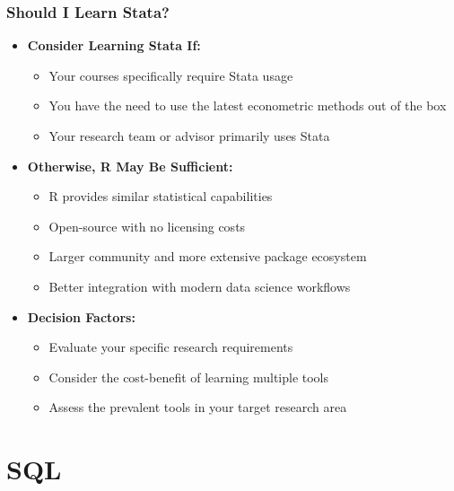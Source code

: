 \documentclass[10pt]{beamer}
\begin{document}
\begin{frame}
    \frametitle{Should I Learn Stata?}
    \begin{itemize}
        \item \textbf{Consider Learning Stata If:}
            \begin{itemize}
                \item Your courses specifically require Stata usage
                \item You have the need to use the latest econometric methods out of the box
                \item Your research team or advisor primarily uses Stata
            \end{itemize}
        \item \textbf{Otherwise, R May Be Sufficient:}
            \begin{itemize}
                \item R provides similar statistical capabilities
                \item Open-source with no licensing costs
                \item Larger community and more extensive package ecosystem
                \item Better integration with modern data science workflows
            \end{itemize}
        \item \textbf{Decision Factors:}
            \begin{itemize}
                \item Evaluate your specific research requirements
                \item Consider the cost-benefit of learning multiple tools
                \item Assess the prevalent tools in your target research area
            \end{itemize}
    \end{itemize}
\end{frame}

\section{SQL}
\end{document}
